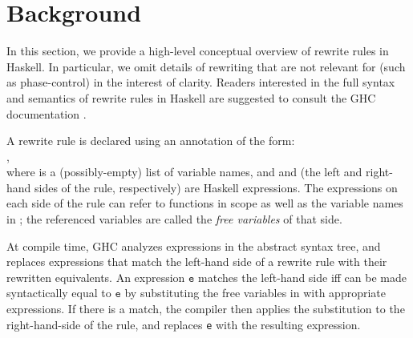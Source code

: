 \section{Background}
\label{sec:background}

In this section, we provide a high-level conceptual overview of rewrite rules in
Haskell. In particular, we omit details of rewriting that are not relevant for
\Rulecheck (such as phase-control) in the interest of clarity. Readers
interested in the full syntax and semantics of rewrite rules in Haskell are
suggested to consult the GHC documentation \cite{userguide}.

A rewrite rule is declared using an annotation of the form:\\ \rrule,\\ where \rbinders is a (possibly-empty) list
of variable names, and \rlhs and \rrhs (the left and
right-hand sides of the rule, respectively) are Haskell expressions. The
expressions on each side of the rule can refer to functions in scope as well as
the variable names in \rbinders; the referenced variables are called
the \textit{free variables} of that side.

At compile time, GHC analyzes expressions in the abstract syntax tree, and
replaces expressions that match the left-hand side of a rewrite rule with their
rewritten equivalents. An expression $\texttt{e}$ matches the left-hand side
\rlhs iff \rlhs can be made syntactically equal to $\texttt{e}$ by substituting
the free variables in \rlhs with appropriate expressions. If there is a match,
the compiler then applies the substitution to the right-hand-side of the rule,
and replaces \texttt{e} with the resulting expression.

